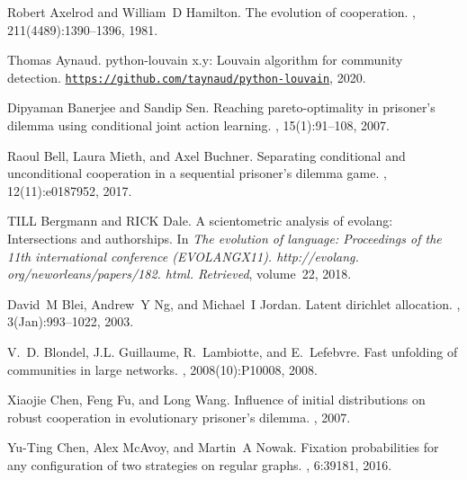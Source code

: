 \documentclass{article}
\theoremstyle{definition}
\begin{document}
\begin{thebibliography}{10}
    Robert Axelrod and William~D Hamilton.
    \newblock The evolution of cooperation.
    , 211(4489):1390--1396, 1981.
    
    Thomas Aynaud.
    \newblock python-louvain x.y: Louvain algorithm for community detection.
    \newblock
      \href{https://github.com/taynaud/python-louvain}{\texttt{https://github.com/taynaud/python-louvain}},
      2020.
    
    Dipyaman Banerjee and Sandip Sen.
    \newblock Reaching pareto-optimality in prisoner’s dilemma using conditional
      joint action learning.
    , 15(1):91--108, 2007.
    
    Raoul Bell, Laura Mieth, and Axel Buchner.
    \newblock Separating conditional and unconditional cooperation in a sequential
      prisoner’s dilemma game.
    , 12(11):e0187952, 2017.
    
    TILL Bergmann and RICK Dale.
    \newblock A scientometric analysis of evolang: Intersections and authorships.
    \newblock In {\em The evolution of language: Proceedings of the 11th
      international conference (EVOLANGX11). http://evolang.
      org/neworleans/papers/182. html. Retrieved}, volume~22, 2018.
    
    David~M Blei, Andrew~Y Ng, and Michael~I Jordan.
    \newblock Latent dirichlet allocation.
    , 3(Jan):993--1022, 2003.
    
    V.~D. Blondel, J.L. Guillaume, R.~Lambiotte, and E.~Lefebvre.
    \newblock Fast unfolding of communities in large networks.
    ,
      2008(10):P10008, 2008.
    
    Xiaojie Chen, Feng Fu, and Long Wang.
    \newblock Influence of initial distributions on robust cooperation in
      evolutionary prisoner's dilemma.
    , 2007.
    
    Yu-Ting Chen, Alex McAvoy, and Martin~A Nowak.
    \newblock Fixation probabilities for any configuration of two strategies on
      regular graphs.
    , 6:39181, 2016.
    

\end{thebibliography}
\end{document}
